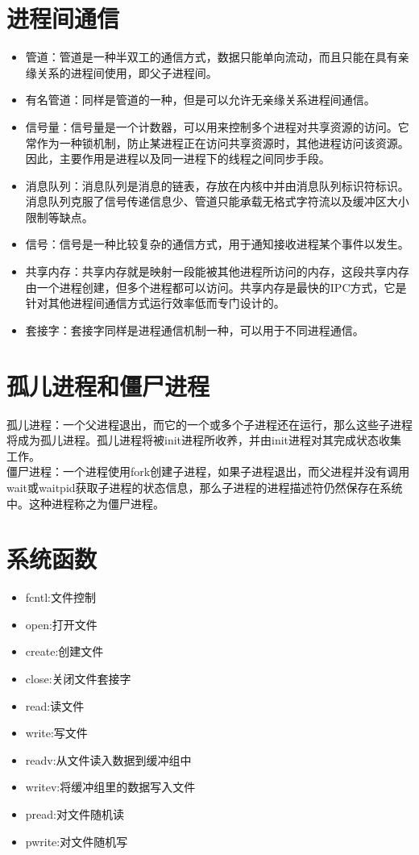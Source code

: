 \section{进程间通信}
\begin{itemize}
\item 管道：管道是一种半双工的通信方式，数据只能单向流动，而且只能在具有亲缘关系的进程间使用，即父子进程间。
\item 有名管道：同样是管道的一种，但是可以允许无亲缘关系进程间通信。
\item 信号量：信号量是一个计数器，可以用来控制多个进程对共享资源的访问。它常作为一种锁机制，防止某进程正在访问共享资源时，其他进程访问该资源。因此，主要作用是进程以及同一进程下的线程之间同步手段。
\item 消息队列：消息队列是消息的链表，存放在内核中并由消息队列标识符标识。消息队列克服了信号传递信息少、管道只能承载无格式字符流以及缓冲区大小限制等缺点。
\item 信号：信号是一种比较复杂的通信方式，用于通知接收进程某个事件以发生。
\item 共享内存：共享内存就是映射一段能被其他进程所访问的内存，这段共享内存由一个进程创建，但多个进程都可以访问。共享内存是最快的IPC方式，它是针对其他进程间通信方式运行效率低而专门设计的。
\item 套接字：套接字同样是进程通信机制一种，可以用于不同进程通信。
\end{itemize}
\section{孤儿进程和僵尸进程}
孤儿进程：一个父进程退出，而它的一个或多个子进程还在运行，那么这些子进程将成为孤儿进程。孤儿进程将被init进程所收养，并由init进程对其完成状态收集工作。\\
僵尸进程：一个进程使用fork创建子进程，如果子进程退出，而父进程并没有调用wait或waitpid获取子进程的状态信息，那么子进程的进程描述符仍然保存在系统中。这种进程称之为僵尸进程。
\section{系统函数}
\begin{itemize}
\item fcntl:文件控制
\item open:打开文件
\item create:创建文件
\item close:关闭文件套接字
\item read:读文件
\item write:写文件
\item readv:从文件读入数据到缓冲组中
\item writev:将缓冲组里的数据写入文件
\item pread:对文件随机读
\item pwrite:对文件随机写
\end{itemize}

